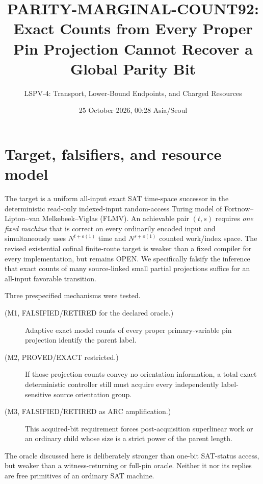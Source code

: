 \documentclass[11pt]{article}
\title{PARITY-MARGINAL-COUNT92: Exact Counts from Every Proper Pin Projection Cannot Recover a Global Parity Bit}
\author{LSPV-4: Transport, Lower-Bound Endpoints, and Charged Resources}
\date{25 October 2026, 00:28 Asia/Seoul}
\begin{document}
\maketitle
\begin{center}
\end{center}

\section{Target, falsifiers, and resource model}
The target is a uniform all-input exact SAT time-space successor in the deterministic read-only indexed-input random-access Turing model of Fortnow--Lipton--van Melkebeek--Viglas (FLMV). An achievable pair $(t,s)$ requires \emph{one fixed machine} that is correct on every ordinarily encoded input and simultaneously uses $N^{t+o(1)}$ time and $N^{s+o(1)}$ counted work/index space. The revised existential cofinal finite-route target is weaker than a fixed compiler for every implementation, but remains OPEN. We specifically falsify the inference that exact counts of many source-linked small partial projections suffice for an all-input favorable transition.

Three prespecified mechanisms were tested.
\begin{description}
\item[(M1, FALSIFIED/RETIRED for the declared oracle.)] Adaptive exact model counts of every proper primary-variable pin projection identify the parent label.
\item[(M2, PROVED/EXACT restricted.)] If those projection counts convey no orientation information, a total exact deterministic controller still must acquire every independently label-sensitive source orientation group.
\item[(M3, FALSIFIED/RETIRED as ARC amplification.)] This acquired-bit requirement forces post-acquisition superlinear work or an ordinary child whose size is a strict power of the parent length.
\end{description}
The oracle discussed here is deliberately stronger than one-bit SAT-status access, but weaker than a witness-returning or full-pin oracle. Neither it nor its replies are free primitives of an ordinary SAT machine.
\end{document}
